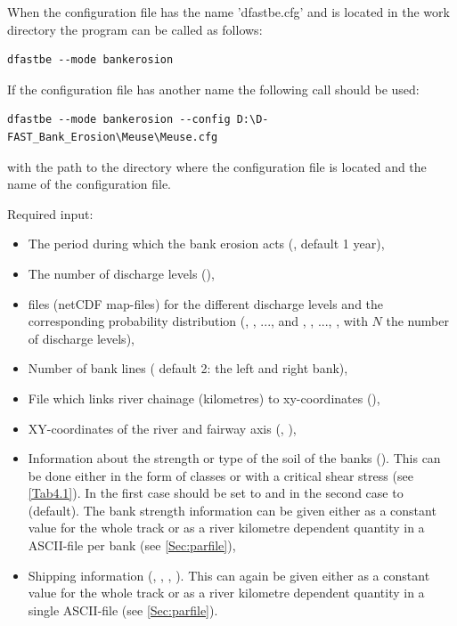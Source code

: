When the configuration file has the name 'dfastbe.cfg' and is located in the work directory the program can be called as follows:

\begin{Verbatim}
dfastbe --mode bankerosion
\end{Verbatim}

If the configuration file has another name the following call should be used:

\begin{Verbatim}
dfastbe --mode bankerosion --config D:\D-FAST_Bank_Erosion\Meuse\Meuse.cfg
\end{Verbatim}

with  the path to the directory where the configuration file is located and  the name of the configuration file.

Required input:

\begin{itemize}
\item The period during which the bank erosion acts (, default 1 year),
\item The number of discharge levels (),
\item \dflowfm files (netCDF map-files) for the different discharge levels and the corresponding probability distribution (, , ...,  and , , ..., , with $N$ the number of discharge levels),
\item Number of bank lines ( default 2: the left and right bank),
\item File which links river chainage (kilometres) to xy-coordinates (),
\item XY-coordinates of the river and fairway axis (, ),
\item Information about the strength or type of the soil of the banks ().
This can be done either in the form of classes or with a critical shear stress (see \autoref{Tab4.1}).
In the first case  should be set to  and in the second case to  (default).
The bank strength information can be given either as a constant value for the whole track or as a river kilometre dependent quantity in a ASCII-file per bank (see \autoref{Sec:parfile}),
\item Shipping information (, , , ).
This can again be given either as a constant value for the whole track or as a river kilometre dependent quantity in a single ASCII-file (see \autoref{Sec:parfile}).
\end{itemize}

